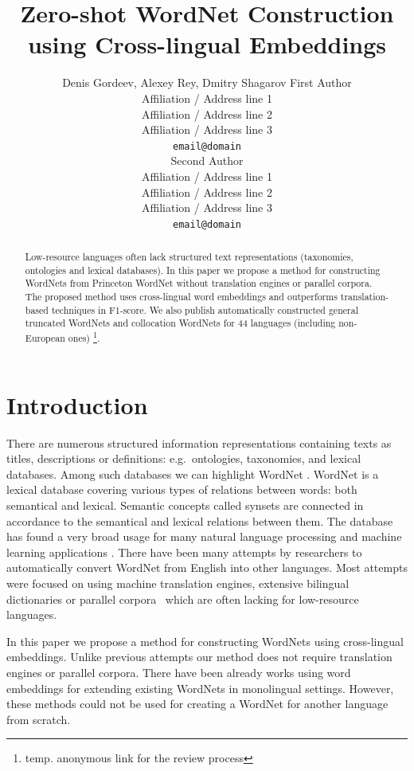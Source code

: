 \documentclass[11pt,a4paper]{article}
\title{Zero-shot WordNet Construction using Cross-lingual Embeddings}
\author{Denis Gordeev, Alexey Rey, Dmitry Shagarov
	First Author \\
  Affiliation / Address line 1 \\
  Affiliation / Address line 2 \\
  Affiliation / Address line 3 \\
  \texttt{email@domain} \\\And
  Second Author \\
  Affiliation / Address line 1 \\
  Affiliation / Address line 2 \\
  Affiliation / Address line 3 \\
  \texttt{email@domain} \\}
\date{}
\begin{document}
\maketitle
\begin{abstract}
Low-resource languages often lack structured text representations (taxonomies, ontologies and lexical databases). In this paper we propose a method for constructing WordNets from Princeton WordNet without translation engines or parallel corpora. The proposed method uses cross-lingual word embeddings and outperforms translation-based techniques in F1-score. We also publish automatically constructed general truncated WordNets and collocation WordNets for 44 languages (including non-European ones) \footnote{temp. anonymous link for the review process}.
\end{abstract}

\section{Introduction}

There are numerous structured information representations containing texts as titles, descriptions or definitions: e.g.\ ontologies, taxonomies, and lexical databases. Among such databases we can highlight WordNet \cite{wordnet}. WordNet is a lexical database covering various types of relations between words: both semantical and lexical. Semantic concepts called synsets are connected in accordance to the semantical and lexical relations between them. The database has found a very broad usage for many natural language processing and machine learning applications \cite{kutuzovgraphwordnet,mao-semeval}.
There have been many attempts by researchers to automatically convert WordNet from English into other languages. Most attempts were focused on using machine translation engines, extensive bilingual dictionaries or parallel corpora~\cite{Khodak2017,NEALE18.1030} which are often lacking for low-resource languages.

In this paper we propose a method for constructing WordNets using cross-lingual embeddings. Unlike previous attempts our method does not require translation engines or parallel corpora. There have been already works using word embeddings for extending existing WordNets \cite{sand2017wordnet,tarouti} in monolingual settings. However, these methods could not be used for creating a WordNet for another language from scratch.
\end{document}
